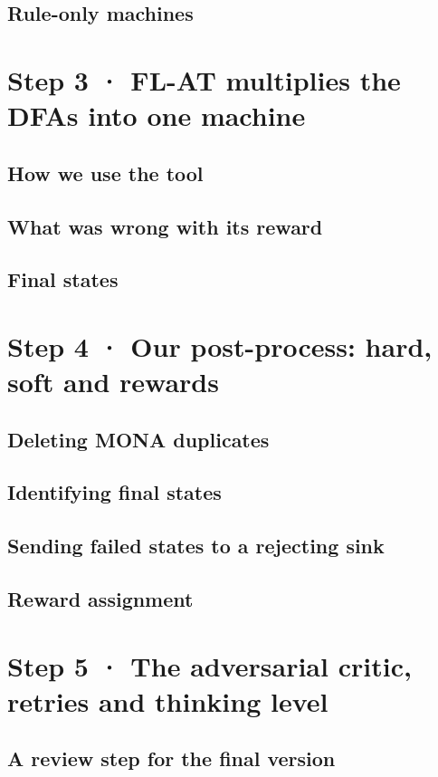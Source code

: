 \documentclass[11pt,english,listoffigures,listoftables, listofalgorithms]{tfgetsinf}
\begin{document}
\subsection{Rule-only machines}
\section{Step 3 · FL-AT multiplies the DFAs into one machine}
\label{sec:step3}
\subsection{How we use the tool}
\subsection{What was wrong with its reward}
\subsection{Final states}
\section{Step 4 · Our post-process: hard, soft and rewards}
\label{sec:step4}
\subsection{Deleting MONA duplicates}
\subsection{Identifying final states}
\subsection{Sending failed states to a rejecting sink}
\subsection{Reward assignment}
\section{Step 5 · The adversarial critic, retries and thinking level}
\label{sec:step5}
\subsection{A review step for the final version}
\end{document}
